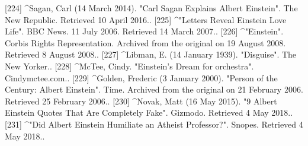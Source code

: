 [224]
^Sagan, Carl (14 March 2014). "Carl Sagan Explains Albert Einstein". The New Republic. Retrieved 10 April 2016..
[225]
^"Letters Reveal Einstein Love Life". BBC News. 11 July 2006. Retrieved 14 March 2007..
[226]
^"Einstein". Corbis Rights Representation. Archived from the original on 19 August 2008. Retrieved 8 August 2008..
[227]
^Libman, E. (14 January 1939). "Disguise". The New Yorker..
[228]
^McTee, Cindy. "Einstein's Dream for orchestra". Cindymctee.com..
[229]
^Golden, Frederic (3 January 2000). "Person of the Century: Albert Einstein". Time. Archived from the original on 21 February 2006. Retrieved 25 February 2006..
[230]
^Novak, Matt (16 May 2015). "9 Albert Einstein Quotes That Are Completely Fake". Gizmodo. Retrieved 4 May 2018..
[231]
^"Did Albert Einstein Humiliate an Atheist Professor?". Snopes. Retrieved 4 May 2018..